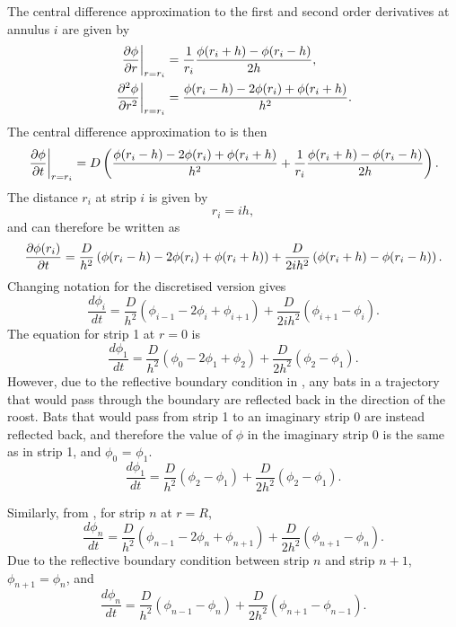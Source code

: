 The central difference approximation to the first and second order derivatives at annulus $i$ are given by
%
\begin{align}
 \left.\frac{\partial \phi}{\partial r}\right|_{r=r_i}&= \frac{1}{r_i}\frac{\phi(r_i+h)-\phi(r_i-h)}{2h}, \\
 \left.\frac{\partial^2 \phi}{\partial r^2}\right|_{r=r_i}&= \frac{\phi(r_i-h)-2\phi(r_i)+\phi(r_i+h)}{h^2}. \label{eqn:diffusion_discretei}
\end{align}
%
The central difference approximation to  is then
%
\begin{equation}
 \left.\frac{\partial \phi}{\partial t}\right|_{r=r_i} = D \left(\frac{\phi(r_i-h)-2\phi(r_i)+\phi(r_i+h)}{h^2} + \frac{1}{r_i} \frac{\phi(r_i+h)-\phi(r_i-h)}{2 h} \right).
 \label{eqn:diffusion_polar_cd}
\end{equation}
%
The distance $r_i$ at strip $i$ is given by
\begin{equation}
r_i = i h ,
\end{equation}
%
and  can therefore be written as
%
\begin{equation}
\frac{\partial \phi(r_i)}{\partial t} = \frac{D}{h^2} \left(\phi(r_i-h)-2\phi(r_i)+\phi(r_i+h)\right) + \frac{D}{2ih^2}\left(\phi(r_i+h)-\phi(r_i-h) \right).
\label{eqn:diffusion_polar_final}
\end{equation}
%
Changing notation for the discretised version gives
%
\begin{equation}
\frac{d\phi_i}{dt} = \frac{D}{h^2}(\phi_{i-1}-2\phi_i +\phi_{i+1}) + \frac{D}{2ih^2} (\phi_{i+1}-\phi_{i}).
        \label{eqn:discrete_diffusion_i}
\end{equation}
%
The equation for strip 1 at $r=0$ is
%
\begin{equation}
\frac{d\phi_1}{dt} = \frac{D}{h^2}(\phi_{0}-2\phi_1 +\phi_{2}) + \frac{D}{2h^2} (\phi_{2}-\phi_{1}).
\end{equation}
%
However, due to the reflective boundary condition in , any bats in a trajectory that would pass through the boundary are reflected back in the direction of the roost. Bats that would pass from strip 1 to an imaginary strip 0 are instead reflected back, and therefore the value of $\phi$ in the imaginary strip 0 is the same as in strip 1, and $\phi_0$ = $\phi_1$.
%
\begin{equation}
\frac{d\phi_1}{dt} = \frac{D}{h^2}(\phi_{2}- \phi_1) + \frac{D}{2h^2} (\phi_{2}-\phi_{1}) .
        \label{eqn:strip_1}
\end{equation}

Similarly, from , for strip $n$ at $r=R$,
%
\begin{equation}
\frac{d\phi_n}{dt} = \frac{D}{h^2}(\phi_{n-1}-2\phi_n +\phi_{n+1}) + \frac{D}{2h^2} (\phi_{n+1}-\phi_{n}) .
\end{equation}
%
Due to the reflective boundary condition between strip $n$ and strip $n+1$, $\phi_{n+1} = \phi_n$, and
\begin{equation}
\frac{d\phi_n}{dt} = \frac{D}{h^2}(\phi_{n-1}-\phi_n) + \frac{D}{2h^2} (\phi_{n+1}-\phi_{n-1}) .
        \label{eqn:strip_n}
\end{equation}

